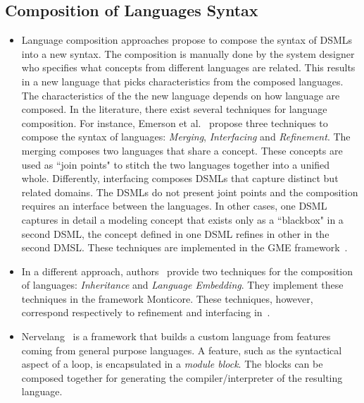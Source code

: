 \subsection{Composition of Languages Syntax}
\begin{itemize}
	\item Language composition approaches propose to compose the syntax of DSMLs into a new syntax. The composition is manually done by the system designer who specifies what concepts from different languages are related. This results in a new language that picks characteristics from the composed languages. The characteristics of the the new language depends on how language are composed. In the literature, there exist several techniques for language composition. For instance, Emerson et al.~\cite{metamodelcompo} propose three techniques to compose the syntax of languages: \emph{Merging}, \emph{Interfacing} and \emph{Refinement}. The merging composes two languages that share a concept. These concepts are used as ``join points" to stitch the two languages together into a unified whole. Differently, interfacing composes DSMLs that capture distinct but related domains. The DSMLs do not present joint points and the composition requires an interface between the languages. In other cases, one DSML captures in detail a modeling concept that exists only as a ``blackbox" in a second DSML, \ie the concept defined in one DSML refines in other in the second DMSL. These techniques are implemented in the GME framework~\cite{metamodelcompo}. 
	
	\item In a different approach, authors~\cite{monticore} provide two techniques for the composition of languages: \emph{Inheritance} and \emph{Language Embedding}. They implement these techniques in the framework Monticore. These techniques, however, correspond respectively to refinement and interfacing in~\cite{metamodelcompo}.
	
	\item Nervelang~\cite{neverlang} is a framework that builds a custom language from features coming from general purpose languages. A feature, such as the syntactical aspect of a loop, is encapsulated in a \emph{module block}. The blocks can be composed together for generating the compiler/interpreter of the resulting language.  
	
	
\end{itemize}
    	
